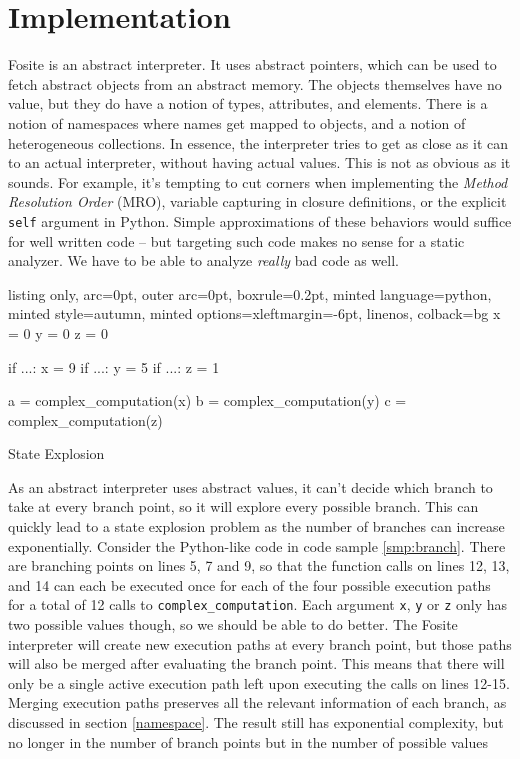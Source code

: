 \documentclass[a4paper, 16pt, oneside]{Thesis}
\begin{document}
\chapter{Implementation}\label{implementation}

Fosite is an abstract interpreter. It uses abstract pointers, which can
be used to fetch abstract objects from an abstract memory. The objects
themselves have no value, but they do have a notion of types,
attributes, and elements. There is a notion of namespaces where names
get mapped to objects, and a notion of heterogeneous collections. In
essence, the interpreter tries to get as close as it can to an actual
interpreter, without having actual values. This is not as obvious as it
sounds. For example, it's tempting to cut corners when implementing the
\emph{Method Resolution Order} (MRO), variable capturing in closure
definitions, or the explicit \texttt{self} argument in Python. Simple
approximations of these behaviors would suffice for well written code --
but targeting such code makes no sense for a static analyzer. We have to
be able to analyze \emph{really} bad code as well.

\begin{code}
  \begin{tcblisting}{listing only, 
  arc=0pt,
  outer arc=0pt, 
  boxrule=0.2pt,
  minted language=python,
  minted style=autumn,
  minted options={xleftmargin=-6pt, linenos},
  colback=bg }
x = 0
y = 0
z = 0

if ...:
    x = 9
    if ...:
        y = 5
        if ...:
            z = 1

a = complex_computation(x)
b = complex_computation(y)
c = complex_computation(z)
\end{tcblisting}
\caption{State Explosion} \label{smp:branch}
\end{code}

As an abstract interpreter uses abstract values, it can't decide which
branch to take at every branch point, so it will explore every possible
branch. This can quickly lead to a state explosion problem as the number
of branches can increase exponentially. Consider the Python-like code in
code sample \ref{smp:branch}. There are branching points on lines 5, 7
and 9, so that the function calls on lines 12, 13, and 14 can each be
executed once for each of the four possible execution paths for a total
of 12 calls to \texttt{complex\_computation}. Each argument \texttt{x},
\texttt{y} or \texttt{z} only has two possible values though, so we
should be able to do better. The Fosite interpreter will create new
execution paths at every branch point, but those paths will also be
merged after evaluating the branch point. This means that there will
only be a single active execution path left upon executing the calls on
lines 12-15. Merging execution paths preserves all the relevant
information of each branch, as discussed in section \ref{namespace}. The
result still has exponential complexity, but no longer in the number of
branch points but in the number of possible values
\end{document}
